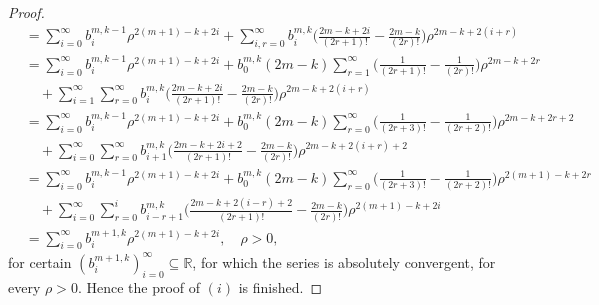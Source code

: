 \documentclass[10pt,a4paper]{amsart}
\begin{document}
\begin{proof}
\begin{align*}
&=\sum_{i=0}^\infty b_i^{m,k-1}\rho ^{2(m+1)-k+2i}+\sum_{i,r=0}^\infty b_i^{m,k}\Big(\frac{2m-k+2i}{(2r+1)!}-\frac{2m-k}{(2r)!}\Big)\rho ^{2m-k+2(i+r)}\\
&=\sum_{i=0}^\infty b_i^{m,k-1}\rho ^{2(m+1)-k+2i}+b_0^{m,k}(2m-k)\sum_{r=1}^\infty  \Big(\frac{1}{(2r+1)!}-\frac{1}{(2r)!}\Big)\rho ^{2m-k+2r}\\
&\quad +\sum_{i=1}^\infty\sum_{r=0}^\infty b_i^{m,k}\Big(\frac{2m-k+2i}{(2r+1)!}-\frac{2m-k}{(2r)!}\Big)\rho ^{2m-k+2(i+r)}\\
&=\sum_{i=0}^\infty b_i^{m,k-1}\rho ^{2(m+1)-k+2i}+b_0^{m,k}(2m-k)\sum_{r=0}^\infty  \Big(\frac{1}{(2r+3)!}-\frac{1}{(2r+2)!}\Big)\rho ^{2m-k+2r+2}\\
&\quad +\sum_{i=0}^\infty\sum_{r=0}^\infty b_{i+1}^{m,k}\Big(\frac{2m-k+2i+2}{(2r+1)!}-\frac{2m-k}{(2r)!}\Big)\rho ^{2m-k+2(i+r)+2}\\
&=\sum_{i=0}^\infty b_i^{m,k-1}\rho ^{2(m+1)-k+2i}+b_0^{m,k}(2m-k)\sum_{r=0}^\infty  \Big(\frac{1}{(2r+3)!}-\frac{1}{(2r+2)!}\Big)\rho ^{2(m+1)-k+2r}\\
&\quad +\sum_{i=0}^\infty\sum_{r=0}^ib_{i-r+1}^{m,k}\Big(\frac{2m-k+2(i-r)+2}{(2r+1)!}-\frac{2m-k}{(2r)!}\Big)\rho ^{2(m+1)-k+2i}\\
&=\sum_{i=0}^\infty b_i^{m+1,k}\rho ^{2(m+1)-k+2i},\quad \rho >0,
\end{align*}
for certain $(b_i^{m+1,k})_{i=0}^\infty\subseteq \mathbb R$, for which  the series is absolutely convergent, for every $\rho >0$. Hence the proof of $(i)$ is finished.


\end{proof}
\end{document}
